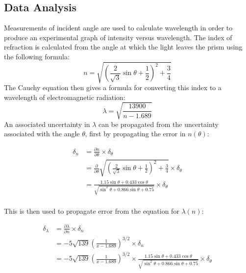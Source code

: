 \documentclass[a4paper]{article}
\begin{document}
\subsection{Data Analysis}

Measurements of incident angle are used to calculate wavelength in order to produce an experimental graph of intensity versus wavelength. The index of refraction is calculated from the angle at which the light leaves the prism using the following formula:
$$
n = \sqrt{
		\left( \frac{2}{\sqrt{3}} \sin \theta 
			   + \frac{1}{2} 
		\right)^2
		+ \frac{3}{4}
	}
$$
The Cauchy equation then gives a formula for converting this index to a wavelength of electromagnetic radiation:
$$ \lambda = \sqrt{\frac{13900}{n-1.689}} $$
An associated uncertainty in $\lambda$ can be propagated from the uncertainty associated with the angle $\theta$, first by propagating the error in $n( \theta )$:

\begin{align*}
\delta_n &= \frac{\partial n}{\partial \theta} \times \delta_{\theta} \\
&= \frac{\partial}{\partial \theta}
   \sqrt{
		\left( \frac{2}{\sqrt{3}} \sin \theta 
			   + \frac{1}{2} 
		\right)^2
		+ \frac{3}{4}
	}
    \times \delta_{\theta} \\
&= \frac{1.15 \sin \theta + 0.433 \cos \theta}{\sqrt{\sin^2 \theta + 0.866 \sin \theta + 0.75}} 
   \times \delta_{\theta} \\
\end{align*}

This is then used to propagate error from the equation for $\lambda (n)$:

\begin{align*}
\delta_{\lambda} 
&= \frac{\partial \lambda}{\partial n} \times \delta_n \\
&= -5 \sqrt{139} 
    \left( \frac{1}{x-1.689} \right) ^{3/2} 
    \times \delta_n \\
&= -5 \sqrt{139} 
    \left( \frac{1}{x-1.689} \right) ^{3/2} 
    \times \frac{1.15 \sin \theta + 0.433 \cos \theta}{\sqrt{\sin^2 \theta + 0.866 \sin \theta + 0.75}} 
   \times \delta_{\theta} \\
\end{align*}
\end{document}

